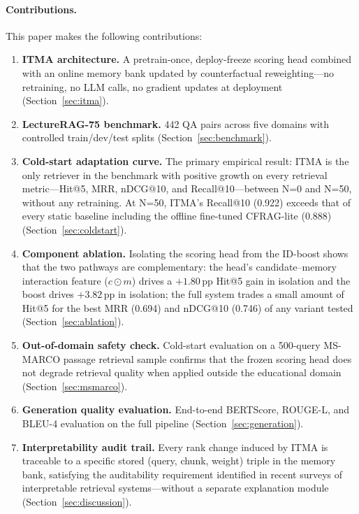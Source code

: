 \documentclass[preprint,12pt]{elsarticle}
\begin{document}
\paragraph{Contributions.}
This paper makes the following contributions:
\begin{enumerate}
  \item \textbf{ITMA architecture.}  A pretrain-once, deploy-freeze scoring
        head combined with an online memory bank updated by counterfactual
        reweighting---no retraining, no LLM calls, no gradient updates at
        deployment (Section~\ref{sec:itma}).
  \item \textbf{LectureRAG-75 benchmark.}  442 QA pairs across five domains
        with controlled train/dev/test splits (Section~\ref{sec:benchmark}).
  \item \textbf{Cold-start adaptation curve.}  The primary empirical result:
        ITMA is the only retriever in the benchmark with positive growth on
        every retrieval metric---Hit@5, MRR, nDCG@10, and Recall@10---between
        N=0 and N=50, without any retraining.  At N=50, ITMA's Recall@10
        (0.922) exceeds that of every static baseline including the offline
        fine-tuned CFRAG-lite (0.888) (Section~\ref{sec:coldstart}).
  \item \textbf{Component ablation.}  Isolating the scoring head from the
        ID-boost shows that the two pathways are complementary: the head's
        candidate--memory interaction feature ($c{\odot}m$) drives a
        $+1.80$\,pp Hit@5 gain in isolation and the boost drives $+3.82$\,pp
        in isolation; the full system trades a small amount of Hit@5
        for the best MRR (0.694) and nDCG@10 (0.746) of any variant tested
        (Section~\ref{sec:ablation}).
  \item \textbf{Out-of-domain safety check.} Cold-start evaluation on a
        500-query MS-MARCO passage retrieval sample confirms that the frozen
        scoring head does not degrade retrieval quality when applied outside
        the educational domain (Section~\ref{sec:msmarco}).
  \item \textbf{Generation quality evaluation.}  End-to-end BERTScore,
        ROUGE-L, and BLEU-4 evaluation on the full pipeline
        (Section~\ref{sec:generation}).
  \item \textbf{Interpretability audit trail.}  Every rank change induced by
        ITMA is traceable to a specific stored (query, chunk, weight) triple in
        the memory bank, satisfying the auditability requirement identified in
        recent surveys of interpretable retrieval systems---without a separate
        explanation module (Section~\ref{sec:discussion}).
\end{enumerate}
\end{document}
